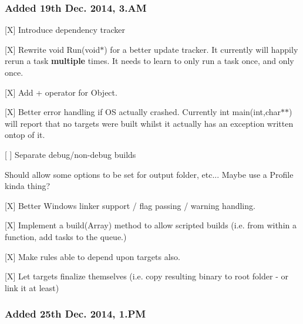 \subsubsection*{Added 19th Dec. 2014, 3.\+AM}


\begin{DoxyItemize}
\item \mbox{[}X\mbox{]} Introduce dependency tracker
\item \mbox{[}X\mbox{]} Rewrite {\ttfamily void Run(void$\ast$)} for a better update tracker. It currently will happily rerun a task {\bfseries multiple} times. It needs to learn to only run a task once, and only once.
\item \mbox{[}X\mbox{]} Add {\ttfamily +} operator for {\ttfamily Object}.
\item \mbox{[}X\mbox{]} Better error handling if OS actually crashed. Currently {\ttfamily int main(int,char$\ast$$\ast$)} will report that no targets were built whilst it actually has an exception written ontop of it.
\item \mbox{[} \mbox{]} Separate debug/non-\/debug builds
\begin{DoxyItemize}
\item Should allow some options to be set for output folder, etc... Maybe use a Profile kinda thing?
\end{DoxyItemize}
\item \mbox{[}X\mbox{]} Better Windows linker support / flag passing / warning handling.
\item \mbox{[}X\mbox{]} Implement a {\ttfamily build(\+Array)} method to allow scripted builds (i.\+e. from within a function, add tasks to the queue.)
\item \mbox{[}X\mbox{]} Make rules able to depend upon targets also.
\item \mbox{[}X\mbox{]} Let targets finalize themselves (i.\+e. copy resulting binary to root folder -\/ or link it at least)
\end{DoxyItemize}

\subsubsection*{Added 25th Dec. 2014, 1.\+PM}


